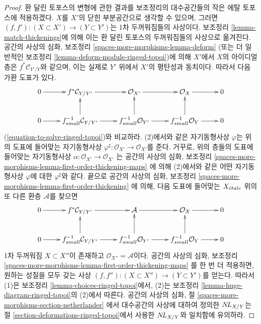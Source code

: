 \begin{proof}
환 달린 토포스의 변형에 관한 결과를 보조정리의 대수공간들의 작은 에탈
토포스에 적용하겠다. $X$를 $X'$의 닫힌 부분공간으로 생각할 수 있으며,
그러면 $(f, f') : (X \subset X') \to (Y \subset Y')$는 1차
두꺼워짐들의 사상이다. 보조정리 \ref{lemma-match-thickenings}에 의해
이는 환 달린 토포스의 두꺼워짐들의 사상으로 옮겨진다. 공간의 사상의
심화, 보조정리
\ref{spaces-more-morphisms-lemma-deform}
(또는 더 일반적인 보조정리 \ref{lemma-deform-module-ringed-topoi})에
의해 $X'$에서 $X$의 아이디얼층은 $f^*\mathcal{C}_{Y'/Y}$와 같으며,
이는 실제로 $Y'$ 위에서 $X'$의 평탄성과 동치이다. 따라서 다음 가환
도표가 있다.
$$
\xymatrix{
0 \ar[r] & f^*\mathcal{C}_{Y/Y'} \ar[r] &
\mathcal{O}_{X'} \ar[r] &
\mathcal{O}_X \ar[r] & 0 \\
0 \ar[r] &
f_{small}^{-1}\mathcal{C}_{Y/Y'} \ar[u] \ar[r] &
f_{small}^{-1}\mathcal{O}_{Y'} \ar[u] \ar[r] &
f_{small}^{-1}\mathcal{O}_Y \ar[u] \ar[r] & 0
}
$$
(\ref{equation-to-solve-ringed-topoi})와 비교하라. (2)에서와 같은
자기동형사상 $\varphi$는 위의 도표에 들어맞는 자기동형사상
$\varphi^\sharp : \mathcal{O}_{X'} \to \mathcal{O}_{X'}$를 준다.
거꾸로, 위의 층들의 도표에 들어맞는 자기동형사상
$\alpha : \mathcal{O}_{X'} \to \mathcal{O}_{X'}$
는 공간의 사상의 심화, 보조정리
\ref{spaces-more-morphisms-lemma-first-order-thickening-maps}
에 의해 (2)에서와 같은 어떤 자기동형사상 $\varphi$에 대한
$\varphi^\sharp$와 같다. 끝으로 공간의 사상의 심화, 보조정리
\ref{spaces-more-morphisms-lemma-first-order-thickening}
에 의해, 다음 도표에 들어맞는 $X_{\acute{e}tale}$ 위의 또 다른 환층
$\mathcal{A}$를 찾으면
$$
\xymatrix{
0 \ar[r] & f^*\mathcal{C}_{Y/Y'} \ar[r] &
\mathcal{A} \ar[r] &
\mathcal{O}_X \ar[r] & 0 \\
0 \ar[r] &
f_{small}^{-1}\mathcal{C}_{Y/Y'} \ar[u] \ar[r] &
f_{small}^{-1}\mathcal{O}_{Y'} \ar[u] \ar[r] &
f_{small}^{-1}\mathcal{O}_Y \ar[u] \ar[r] & 0
}
$$
1차 두꺼워짐 $X \subset X''$이 존재하고
$\mathcal{O}_{X''} = \mathcal{A}$이다. 공간의 사상의 심화, 보조정리
\ref{spaces-more-morphisms-lemma-first-order-thickening-maps}
를 한 번 더 적용하면, 원하는 성질을 모두 갖는 사상
$(f, f'') : (X \subset X'') \to (Y \subset Y')$를 얻는다. 따라서
(1)은 보조정리 \ref{lemma-choices-ringed-topoi}에서, (2)는 보조정리
\ref{lemma-huge-diagram-ringed-topoi}의 (2)에서 따른다. 공간의 사상의
심화, 절
\ref{spaces-more-morphisms-section-netherlander}
에서 대수공간의 사상에 대하여 정의한 $\mathop{N\!L}\nolimits_{X/Y}$는
절 \ref{section-deformations-ringed-topoi}에서 사용한 $\mathop{N\!L}\nolimits_{X/Y}$와
일치함에 유의하라.
\end{proof}

